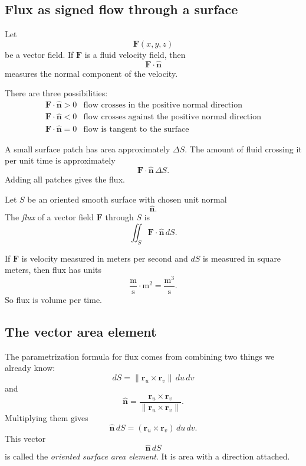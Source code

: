 \subsection{Flux as signed flow through a surface}

Let
\[
    \mathbf F(x,y,z)
\]
be a vector field.  If \(\mathbf F\) is a fluid velocity field, then
\[
    \mathbf F\cdot\widehat{\mathbf n}
\]
measures the normal component of the velocity.

There are three possibilities:
\[
\begin{array}{c|c}
\mathbf F\cdot\widehat{\mathbf n}>0
&
\text{flow crosses in the positive normal direction}
\\[1mm]
\mathbf F\cdot\widehat{\mathbf n}<0
&
\text{flow crosses against the positive normal direction}
\\[1mm]
\mathbf F\cdot\widehat{\mathbf n}=0
&
\text{flow is tangent to the surface}
\end{array}
\]

A small surface patch has area approximately \(\Delta S\).  The amount of fluid crossing
it per unit time is approximately
\[
    \mathbf F\cdot\widehat{\mathbf n}\,\Delta S.
\]
Adding all patches gives the flux.

\begin{definition}
Let \(S\) be an oriented smooth surface with chosen unit normal
\[
    \widehat{\mathbf n}.
\]
The \emph{flux} of a vector field \(\mathbf F\) through \(S\) is
\[
\boxed{
    \iint_S \mathbf F\cdot\widehat{\mathbf n}\,dS.
}
\]
\end{definition}

If \(\mathbf F\) is velocity measured in meters per second and \(dS\) is measured in
square meters, then flux has units
\[
    \frac{\text{m}}{\text{s}}\cdot \text{m}^2
    =
    \frac{\text{m}^3}{\text{s}}.
\]
So flux is volume per time.

\subsection{The vector area element}

The parametrization formula for flux comes from combining two things we already know:
\[
    dS=\|\mathbf r_u\times\mathbf r_v\|\,du\,dv
\]
and
\[
    \widehat{\mathbf n}
    =
    \frac{\mathbf r_u\times\mathbf r_v}
    {\|\mathbf r_u\times\mathbf r_v\|}.
\]
Multiplying them gives
\[
    \widehat{\mathbf n}\,dS
    =
    (\mathbf r_u\times\mathbf r_v)\,du\,dv.
\]
This vector
\[
    \widehat{\mathbf n}\,dS
\]
is called the \emph{oriented surface area element}.  It is area with a direction attached.

